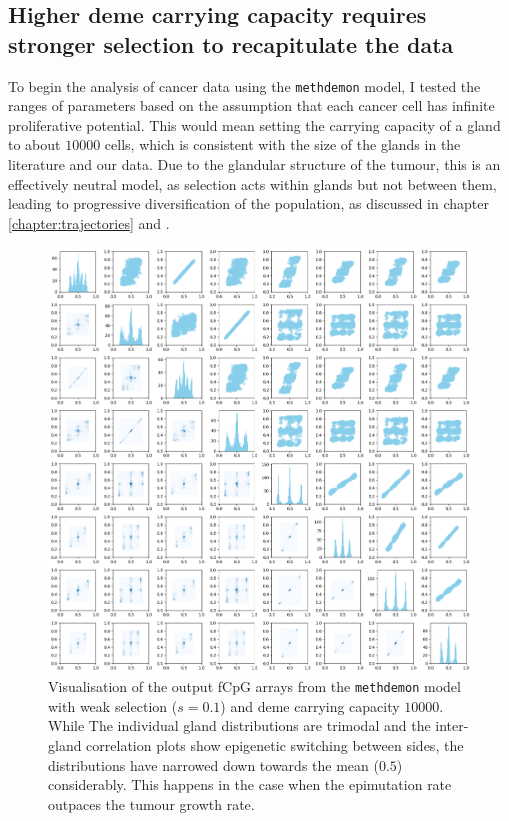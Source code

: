 \subsection{Higher deme carrying capacity requires stronger selection to
recapitulate the data}
To begin the analysis of cancer data using the \texttt{methdemon} model, I tested the
ranges of parameters based on the assumption that each cancer cell has infinite
proliferative potential. This would mean setting the carrying capacity of a gland
to about $10000$ cells, which is consistent with the size of the glands in the
literature \cite{sottoriva_big_2015} and our data. Due to the glandular
structure of the tumour, this is an effectively neutral model, as selection
acts within glands but not between them, leading to progressive diversification
of the population, as discussed in chapter \ref{chapter:trajectories} and
\cite{noble_spatial_2022}.\par

\begin{figure}[h]
    \centering
    \includegraphics[width=\textwidth]{Chapter_5/figures/10000plot.png}
    \caption{Visualisation of the output fCpG arrays from the
    \texttt{methdemon} model with weak selection ($s=0.1$) and deme carrying
    capacity $10000$. While The individual gland distributions are trimodal and
    the inter-gland correlation plots show epigenetic switching between sides,
    the distributions have narrowed down towards the mean ($0.5$) considerably.
    This happens in the case when the epimutation rate outpaces the tumour
    growth rate.}
    \label{fig:methdemon_weak_selection}
\end{figure}

